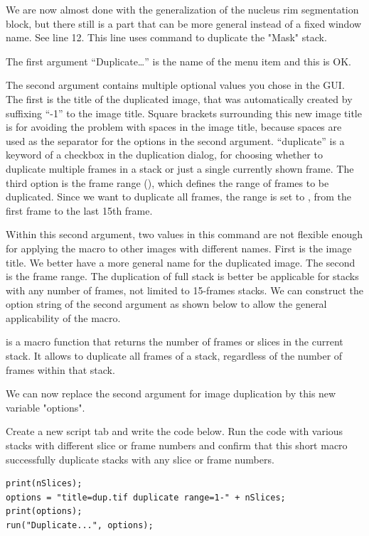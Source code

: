 We are now almost done with the generalization of the nucleus rim segmentation block, but there still is a part that can be more general instead of a fixed window name. See line 12. This line uses  command to duplicate the "Mask" stack. 


The first argument ``Duplicate\ldots'' is the name of the menu item  and this is OK. 

The second argument contains multiple optional values you chose in the GUI. The first is the title of the duplicated image, that was automatically created by suffixing ``-1'' to the image title. Square brackets surrounding this new image title is for avoiding the problem with spaces in the image title, because spaces are used as the separator for the options in the second argument. ``duplicate'' is a keyword of a checkbox in the duplication dialog, for choosing whether to duplicate multiple frames in a stack or just a single currently shown frame. The third option is the frame range (), which defines the range of frames to be duplicated. Since we want to duplicate all frames, the range is set to , from the first frame to the last 15th frame.

Within this second argument, two values in this command are not flexible enough for applying the macro to other images with different names. First is the image title. We better have a more general name for the duplicated image. The second is the frame range. The duplication of full stack is better be applicable for stacks with any number of frames, not limited to 15-frames stacks. 
We can construct the option string of the second argument as shown below to allow the general applicability of the macro. 


 is a macro function that returns the number of frames or slices in the current stack. It allows to duplicate all frames of a stack, regardless of the number of frames within that stack. 

We can now replace the second argument for image duplication by this new variable "options". 


\begin{indentexercise}{2}
Create a new script tab and write the code below. Run the code with various stacks with different slice or frame numbers and confirm that this short macro successfully duplicate stacks with any slice or frame numbers. 
\begin{lstlisting}
print(nSlices);
options = "title=dup.tif duplicate range=1-" + nSlices;
print(options);
run("Duplicate...", options);
\end{lstlisting}
\end{indentexercise}

